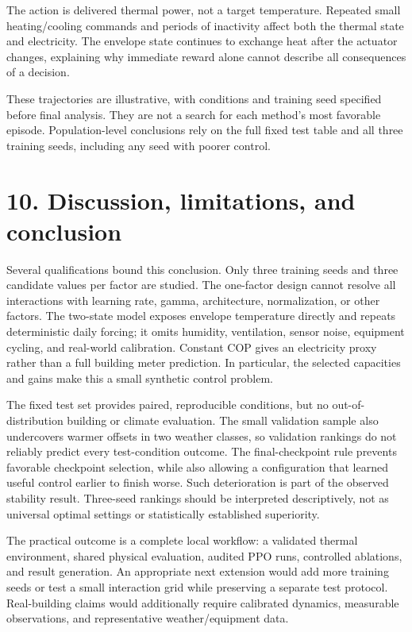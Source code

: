 \documentclass[10pt,a4paper]{article}
\begin{document}
\TrajectoryFinding{}

The action is delivered thermal power, not a target temperature. Repeated small heating/cooling commands and periods of inactivity affect both the thermal state and electricity. The envelope state continues to exchange heat after the actuator changes, explaining why immediate reward alone cannot describe all consequences of a decision.

These trajectories are illustrative, with conditions and training seed specified before final analysis. They are not a search for each method's most favorable episode. Population-level conclusions rely on the full fixed test table and all three training seeds, including any seed with poorer control.
\clearpage

\section*{10. Discussion, limitations, and conclusion}
\ConclusionFinding{}

Several qualifications bound this conclusion. Only three training seeds and three candidate values per factor are studied. The one-factor design cannot resolve all interactions with learning rate, gamma, architecture, normalization, or other factors. The two-state model exposes envelope temperature directly and repeats deterministic daily forcing; it omits humidity, ventilation, sensor noise, equipment cycling, and real-world calibration. Constant COP gives an electricity proxy rather than a full building meter prediction. In particular, the selected capacities and gains make this a small synthetic control problem.

The fixed test set provides paired, reproducible conditions, but no out-of-distribution building or climate evaluation. The small validation sample also undercovers warmer offsets in two weather classes, so validation rankings do not reliably predict every test-condition outcome. The final-checkpoint rule prevents favorable checkpoint selection, while also allowing a configuration that learned useful control earlier to finish worse. Such deterioration is part of the observed stability result. Three-seed rankings should be interpreted descriptively, not as universal optimal settings or statistically established superiority.

The practical outcome is a complete local workflow: a validated thermal environment, shared physical evaluation, audited PPO runs, controlled ablations, and result generation. An appropriate next extension would add more training seeds or test a small interaction grid while preserving a separate test protocol. Real-building claims would additionally require calibrated dynamics, measurable observations, and representative weather/equipment data.
\end{document}
